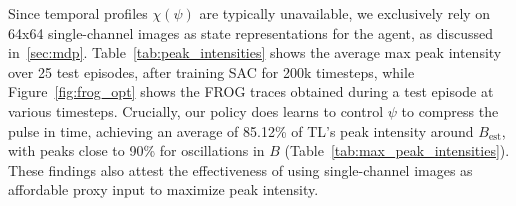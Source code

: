 Since temporal profiles \( \chi(\psi) \) are typically unavailable, we exclusively rely on 64x64 single-channel images as state representations for the agent, as discussed in~\cref{sec:mdp}.
Table~\ref{tab:peak_intensities} shows the average max peak intensity over 25 test episodes, after training SAC for 200k timesteps, while Figure~\ref{fig:frog_opt} shows the FROG traces obtained during a test episode at various timesteps. Crucially, our policy does learns to control \( \psi \) to compress the pulse in time, achieving an average of 85.12\% of TL's peak intensity around \(B_{\text{est}} \), with peaks close to 90\% for oscillations in \( B \) (Table~\ref{tab:max_peak_intensities}). These findings also attest the effectiveness of using single-channel images as affordable proxy input to maximize peak intensity.

\begin{table}
    \centering
    \caption{Average (plus-minus standard deviation) maximal peak intensity over 25 test episodes, for a combination of algorithms, training and testing conditions. We test our algorithms on fixed values of \( B \).
    }
    \label{tab:peak_intensities}
\end{table}
